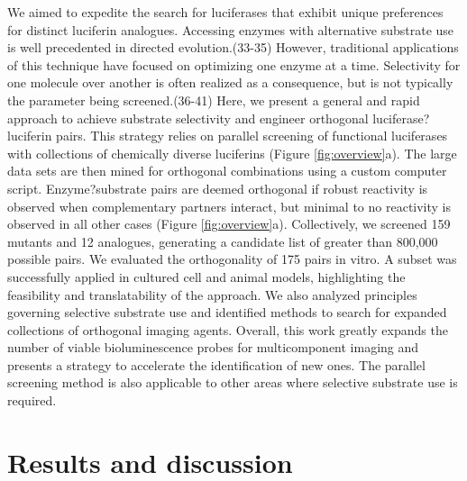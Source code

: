 We aimed to expedite the search for luciferases that exhibit unique preferences for distinct luciferin analogues. Accessing enzymes with alternative substrate use is well precedented in directed evolution.\cite{Renata:2015is,Packer:2015ku,Goldsmith:2012bk}(33-35) However, traditional applications of this technique have focused on optimizing one enzyme at a time. Selectivity for one molecule over another is often realized as a consequence, but is not typically the parameter being screened.\cite{Taylor:2015gd,Feng:2015he,Neumann:2010bz,Lang:2014dj,Owens:2017gp,Wan:2010hk}(36-41) Here, we present a
  general and rapid approach to achieve substrate selectivity and engineer orthogonal luciferase?luciferin pairs. This strategy relies on parallel screening of functional luciferases with collections of chemically diverse luciferins (Figure \ref{fig:overview}a). The large data sets are then mined for orthogonal combinations using a custom computer script. Enzyme?substrate pairs are deemed orthogonal if robust reactivity is observed when complementary partners interact, but minimal to no reactivity is observed in all other cases (Figure \ref{fig:overview}a). Collectively, we screened 159 mutants and 12 analogues, generating a candidate list of greater than 800,000 possible pairs. We evaluated the orthogonality of 175 pairs in vitro. A subset was successfully applied in cultured cell and animal models, highlighting the feasibility and translatability of the approach. We also analyzed principles governing selective substrate use and identified methods to search for expanded collections of orthogonal imaging agents. Overall, this work greatly expands the number of viable bioluminescence probes for multicomponent imaging and presents a strategy to accelerate the identification of new ones. The parallel screening method is also applicable to other areas where selective substrate use is required.

\section{Results and discussion}

